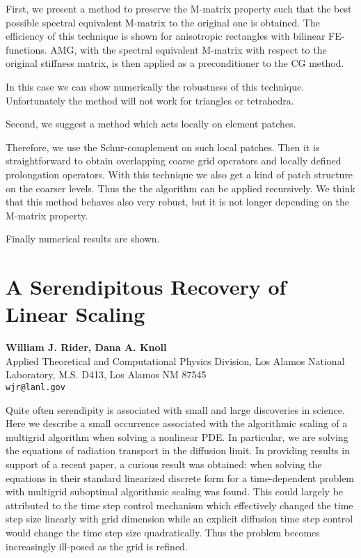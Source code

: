 \documentclass[11pt]{article}
\newcommand{\nextab}[4]{
	\section{#2}
	{\bf #1} \\ \nopagebreak
	{#3} \\ \nopagebreak
	{\tt #4} \nopagebreak
	}
\begin{document}
First, we present a method to preserve the M-matrix property such that
the best possible spectral equivalent M-matrix to the original one is obtained.
The efficiency of this technique is shown for anisotropic rectangles with
bilinear FE-functions. AMG, with the spectral equivalent M-matrix with
respect to the original stiffness matrix, is then applied as a preconditioner
to the CG method.

In this case we can show numerically the robustness of this technique.
Unfortunately the method will not work for triangles or tetrahedra.

Second, we suggest a method which acts locally on element patches.

Therefore, we use the Schur-complement on such local patches. Then
it is straightforward to obtain  overlapping coarse grid operators
and locally defined prolongation operators. With this technique we also
get a kind of patch structure on the coarser levels. Thus the the algorithm
can be applied recursively. We think that this method behaves also very
robust, but it is not longer depending on the M-matrix property.

Finally numerical results are shown.


\pagebreak


\nextab{William J. Rider, Dana A. Knoll}
	{A Serendipitous Recovery of Linear Scaling}
	{Applied Theoretical and Computational Physics Division,
	Los Alamos National Laboratory, M.S. D413, Los Alamos NM 87545}
	{wjr@lanl.gov}

Quite often serendipity is associated with small and large
discoveries in science.  Here we describe a small occurrence
associated with the algorithmic scaling of a multigrid algorithm
when solving a nonlinear PDE.  In particular, we are solving
the equations of radiation transport in the diffusion limit.
In providing results in support of a recent paper, a curious result
was obtained: when solving the equations in their standard linearized
discrete form for a time-dependent problem with multigrid suboptimal
algorithmic scaling was found.  This could largely be attributed to
the time step control mechanism which effectively changed the time
step size linearly with grid dimension while an explicit diffusion
time step control would change the time step size quadratically.
Thus the problem becomes increasingly ill-posed as the grid is
refined.
\end{document}

